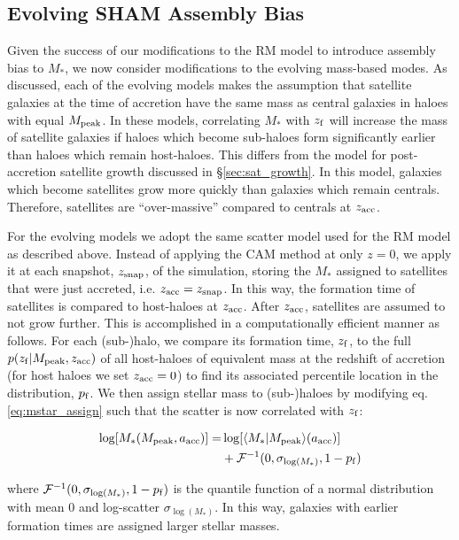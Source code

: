 \documentclass[a4paper,fleqn,usenatbib]{mnras}
\begin{document}
\subsection{Evolving SHAM Assembly Bias}

Given the success of our modifications to the RM model to introduce assembly bias to $M_*$, we now consider modifications to the evolving mass-based modes.  As discussed, each of the evolving models makes the assumption that satellite galaxies at the time of accretion have the same mass as central galaxies in haloes with equal $M_{\rm peak}$.  In these models, correlating $M_*$ with $z_{\rm f}$ will increase the mass of satellite galaxies if haloes which become sub-haloes form significantly earlier than haloes which remain host-haloes.  This differs from the model for post-accretion satellite growth discussed in \S \ref{sec:sat_growth}.  In this model, galaxies which become satellites grow more quickly than galaxies which remain centrals.  Therefore, satellites are ``over-massive'' compared to centrals at $z_{\rm acc}$. 

For the evolving models we adopt the same scatter model used for the RM model as described above.  Instead of applying the CAM method at only $z=0$, we apply it at each snapshot, $z_{\rm snap}$, of the simulation, storing the $M_*$ assigned to satellites that were just accreted, i.e. $z_{\rm acc} = z_{\rm snap}$.  In this way, the formation time of satellites is compared to host-haloes at $z_{\rm acc}$.  After $z_{\rm acc}$, satellites are assumed to not grow further.  This is accomplished in a computationally efficient manner as follows.  For each (sub-)halo, we compare its formation time, $z_{\rm f}$, to the full $p(z_{\rm f} | M_{\rm peak}, z_{\rm acc})$ of all host-haloes of equivalent mass at the redshift of accretion (for host haloes we set $z_{\rm acc}=0$) to find its associated percentile location in the distribution, $p_{\rm f}$.  We then assign stellar mass to (sub-)haloes by modifying eq. \ref{eq:mstar_assign} such that the scatter is now correlated with $z_{\rm f}$:
%
\begin{linenomath}
\begin{align}
\log[M_*(M_{\rm peak}, a_{\rm acc})] =& \log[\langle M_* | M_{\rm peak}\rangle(a_{\rm acc})] \\ \nonumber
&+ \mathcal{F}^{-1}(0,\sigma_{\log(M_*)}, 1-p_{\rm f})
\end{align}
\end{linenomath}
%
where $\mathcal{F}^{-1}(0,\sigma_{\log(M_*)}, 1-p_{\rm f})$ is the quantile function of a normal distribution with mean 0 and log-scatter $\sigma_{\log(M_*)}$.  In this way, galaxies with earlier formation times are assigned larger stellar masses. 
\end{document}
